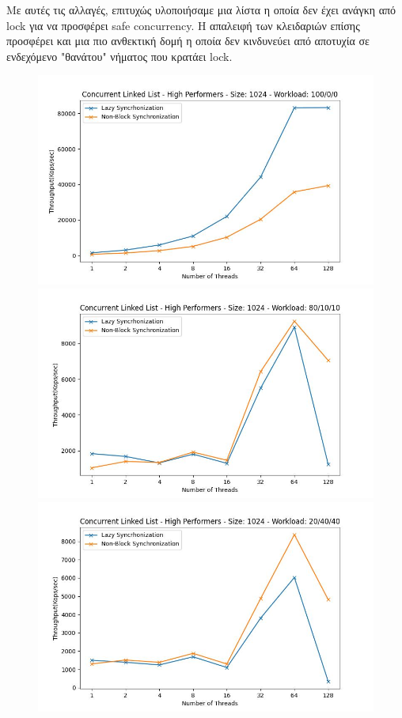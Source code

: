\documentclass[../final_report.tex]{subfiles}
\begin{document}
Με αυτές τις αλλαγές, επιτυχώς υλοποιήσαμε μια λίστα η οποία δεν έχει ανάγκη από lock για να προσφέρει safe concurrency. Η απαλειφή των κλειδαριών
επίσης προσφέρει και μια πιο ανθεκτική δομή η οποία δεν κινδυνεύει από αποτυχία σε ενδεχόμενο "θανάτου" νήματος που κρατάει lock.

\begin{figure}[H]
    \centering
        \includegraphics[scale=0.4]{outFiles/plots/concurrent_data_structs_high_1024_100_0_0.jpg}
        \includegraphics[scale=0.4]{outFiles/plots/concurrent_data_structs_high_1024_80_10_10.jpg}
        \includegraphics[scale=0.4]{outFiles/plots/concurrent_data_structs_high_1024_20_40_40.jpg}

\end{figure}
\end{document}
